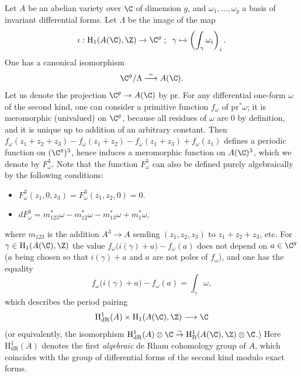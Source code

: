 Let $A$ be an abelian variety over $\C$ of dimension $g$, 
and $\omega_1,\ldots,\omega_g$ a basis of invariant differential forms.
Let $\Lambda$ be the image of the map
\begin{equation*}
 \iota:\mathrm{H}_1(A(\C),\Z)\rightarrow \C^g\; ;\;\; \gamma\mapsto
 \left(\int_{\gamma}\omega_i\right)_i.
\end{equation*}
One has a canonical isomorphism 
\begin{equation*}
\C^g/\Lambda\stackrel{\sim}{\longrightarrow}A(\C).
\end{equation*}
Let us denote the projection $\C^g\rightarrow A(\C)$ by $\mathrm{pr}$.
For any differential one-form $\omega$ of the second kind, one can 
consider a primitive function $f_{\omega}$
of $\mathrm{pr}^{\ast}\omega$; it is meromorphic (univalued) on 
$\C^g$, because all residues of $\omega$ are $0$ by definition, and
it is unique up to addition of an arbitrary constant.
Then $f_{\omega}(z_1+z_2+z_3)-f_{\omega}(z_1+z_2)-f_{\omega}(z_1+z_3)
+f_{\omega}(z_1)$ defines a periodic function on $(\C^g)^3$, hence
induces a meromorphic function on $A(\C)^3$, which we denote by
$F^3_{\omega}$.
Note that the function $F^3_{\omega}$ can also be defined purely
algebraically by the following conditions:
\begin{itemize}
\item $F^3_{\omega}(z_1,0,z_3)=F^3_{\omega}(z_1,z_2,0)=0$.
\item $dF^3_{\omega}=m^{\ast}_{123}\omega-m^{\ast}_{12}\omega
-m^{\ast}_{13}\omega+m^{\ast}_1\omega,$
\end{itemize}
where $m_{123}$ is the addition $A^3\rightarrow A$ sending 
$(z_1,z_2,z_3)$ to $z_1+z_2+z_3$, etc.
For $\gamma\in\mathrm{H}_1(A(\C),\Z)$ the value
$f_{\omega}\bigl(i(\gamma)+a\bigr)-f_{\omega}(a)$ 
does not depend on $a\in\C^g$ ($a$ being chosen so that
$i(\gamma)+a$ and $a$ are not poles of $f_{\omega}$),
and one has the equality
\begin{equation*}
f_{\omega}\bigl(i(\gamma)+a\bigr)-f_{\omega}(a)=
\int_{\gamma}\omega,
\end{equation*}
which describes the period pairing 
\begin{equation*}
\mathrm{H}^1_{\mathrm{dR}}(A)
\times\mathrm{H}_1(A(\C),\Z)\longrightarrow\C
\end{equation*}
(or equivalently, the isomorphism
$\mathrm{H}^1_{\mathrm{dR}}(A)\otimes\C
\stackrel{\sim}{\rightarrow}
\mathrm{H}^1_{\mathrm{B}}(A(\C),\Z)\otimes\C$.)
Here $\mathrm{H}^1_{\mathrm{dR}}(A)$ denotes the first \emph{algebraic}
de Rham cohomology group of $A$, which coincides with the group of 
differential forms of the second kind modulo exact forms.

